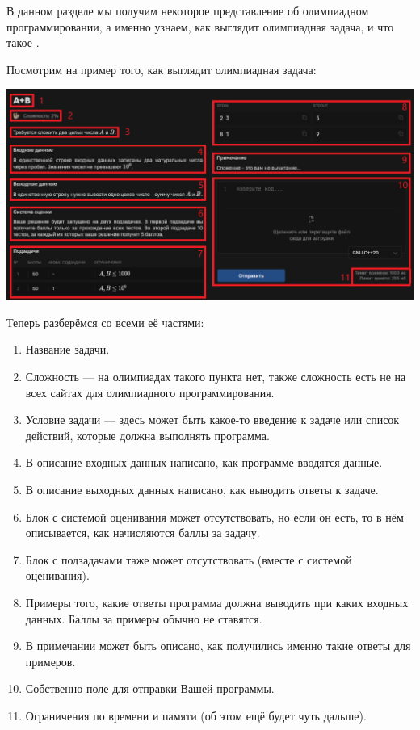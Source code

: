 В данном разделе мы получим некоторое представление об олимпиадном программировании, а именно узнаем, как выглядит олимпиадная задача, и что такое .

Посмотрим на пример того, как выглядит олимпиадная задача:

\includegraphics[scale=0.66]{img/task.png}

Теперь разберёмся со всеми её частями:
\begin{enumerate}
    \item Название задачи.
    \item Сложность — на олимпиадах такого пункта нет, также сложность есть не на всех сайтах для олимпиадного программирования.
    \item Условие задачи — здесь может быть какое-то введение к задаче или список действий, которые должна выполнять программа. 
    \item В описание входных данных написано, как программе вводятся данные.
    \item В описание выходных данных написано, как выводить ответы к задаче.
    \item Блок с системой оценивания может отсутствовать, но если он есть, то в нём описывается, как начисляются баллы за задачу.
    \item Блок с подзадачами таже может отсутствовать (вместе с системой оценивания).
    \item Примеры того, какие ответы программа должна выводить при каких входных данных. Баллы за примеры обычно не ставятся.
    \item В примечании может быть описано, как получились именно такие ответы для примеров.
    \item Собственно поле для отправки Вашей программы.
    \item Ограничения по времени и памяти (об этом ещё будет чуть дальше).
\end{enumerate}

